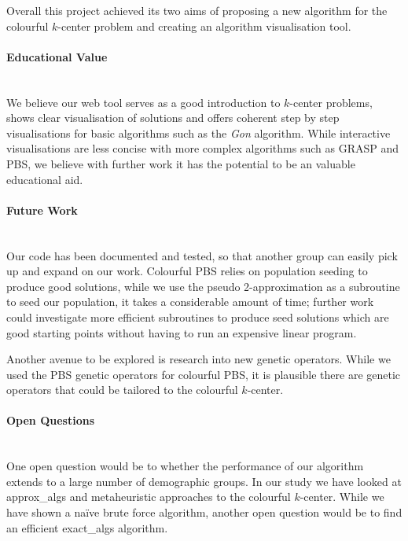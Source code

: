 Overall this project achieved its two aims of proposing a new algorithm for the colourful $k$-center problem and creating an algorithm visualisation tool.

\paragraph{Educational Value}~\\
We believe our web tool serves as a good introduction to $k$-center problems, shows clear visualisation of solutions and offers coherent step by step visualisations for basic algorithms such as the \emph{Gon} algorithm. While interactive visualisations are less concise with more complex algorithms such as GRASP and PBS, we believe with further work it has the potential to be an valuable educational aid.

\paragraph{Future Work}~\\
Our code has been documented and tested, so that another group can easily pick up and expand on our work. Colourful PBS relies on population seeding to produce good solutions, while we use the pseudo 2-approximation as a subroutine to seed our population, it takes a considerable amount of time; further work could investigate more efficient subroutines to produce seed solutions which are good starting points without having to run an expensive linear program.

Another avenue to be explored is research into new genetic operators. While we used the PBS genetic operators for colourful PBS, it is plausible there are genetic operators that could be tailored to the colourful $k$-center.

\paragraph{Open Questions}~\\
One open question would be to whether the performance of our algorithm extends to a large number of demographic groups. In our study we have looked at \gls{approx_algs} and \gls{metaheuristic} approaches to the colourful $k$-center. While we have shown a na\"ive brute force algorithm, another open question would be to find an efficient \gls{exact_algs} algorithm.

